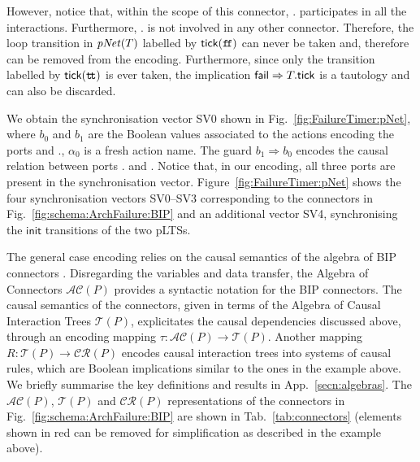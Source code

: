 \documentclass{llncs}
\newcommand{\fig}[1]{Fig.~\ref{fig:#1}}
\newcommand{\Fig}[1]{Figure~\ref{fig:#1}}
\newcommand{\tab}[1]{Tab.~\ref{tab:#1}}
\newcommand{\app}[1]{App.~\ref{secn:#1}}
\newcommand{\ndash}{--}
\newcommand{\true} {\ensuremath{\mathtt{t\!t}}}
\newcommand{\false}{\ensuremath{\mathtt{f\!f}}}
\newcommand{\init} {\ensuremath{\mathsf{init}}}
\newcommand{\ct}{\ensuremath{\mathcal{T}}}
\newcommand{\cru}{\ensuremath{\mathcal{CR}}}
\newcommand{\ac}{\ensuremath{\mathcal{AC}}}
\newcommand{\nopri}[1][]{\ensuremath{\mathit{pNet}%
    \ifx#1\relax\else(#1)\fi}}
\begin{document}
However, notice
that, within the scope of this connector, {\NameTimer.\PortTick}
participates in all the interactions.
%
Furthermore, {\NameTimer.\PortTick} is not involved in any other
connector.  Therefore, the loop transition in \nopri[\NameTimer]
labelled by $\PortTick(\false)$ can never be taken and, therefore can
be removed from the encoding.  Furthermore, since only the transition
labelled by $\PortTick(\true)$ is ever taken, 
%
the
implication $\mathsf{fail} \Rightarrow T.\mathsf{tick}$ is a tautology and can also be discarded.

We obtain the
synchronisation vector SV0 shown in \fig{FailureTimer:pNet}, where $b_0$ and
$b_1$ are the Boolean values associated to the actions encoding the
ports {\PortFail} and {\NameCtrl.\PortFail}, $\alpha_0$ is a fresh
action name.  The guard $b_1 \Rightarrow b_0$ encodes the causal
relation between ports {\NameCtrl.\PortFail} and {\PortFail}.  Notice
that, in our encoding, all three ports are present in the
synchronisation vector.  \Fig{FailureTimer:pNet} shows
the four synchronisation vectors SV0\ndash SV3 corresponding to the
connectors in \fig{schema:ArchFailure:BIP} and an additional vector
SV4, synchronising the {\init} transitions of the two pLTSs.

The general case encoding relies on the causal semantics of the
algebra of BIP connectors \cite{BliSif10-causal-fmsd}.  Disregarding
the variables and data transfer, the Algebra of Connectors $\ac(P)$
\cite{BliSif07-acp-emsoft} provides a syntactic notation for the BIP
connectors.  The causal semantics of the connectors, given in terms of
the Algebra of Causal Interaction Trees $\ct(P)$, explicitates the
causal dependencies discussed above, through an encoding mapping
$\tau: \ac(P) \rightarrow \ct(P)$.  Another mapping $R: \ct(P)
\rightarrow \cru(P)$ encodes causal interaction trees into systems of
causal rules, which are Boolean implications similar to the ones in
the example above.  We briefly summarise the key definitions and
results in \app{algebras}.  The $\ac(P)$, $\ct(P)$ and $\cru(P)$
representations of the connectors in \fig{schema:ArchFailure:BIP} are
shown in \tab{connectors} (elements shown in red can be removed for
simplification as described in the example above).
\end{document}
